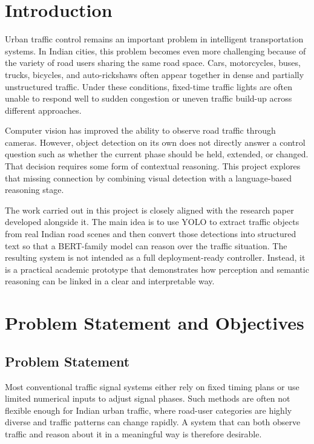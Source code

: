 \documentclass[12pt,a4paper]{report}
\begin{document}
\tableofcontents
\listoffigures
\listoftables

\clearpage
{}

\chapter{Introduction}
Urban traffic control remains an important problem in intelligent transportation systems. In Indian cities, this problem becomes even more challenging because of the variety of road users sharing the same road space. Cars, motorcycles, buses, trucks, bicycles, and auto-rickshaws often appear together in dense and partially unstructured traffic. Under these conditions, fixed-time traffic lights are often unable to respond well to sudden congestion or uneven traffic build-up across different approaches.

Computer vision has improved the ability to observe road traffic through cameras. However, object detection on its own does not directly answer a control question such as whether the current phase should be held, extended, or changed. That decision requires some form of contextual reasoning. This project explores that missing connection by combining visual detection with a language-based reasoning stage.

The work carried out in this project is closely aligned with the research paper developed alongside it. The main idea is to use YOLO to extract traffic objects from real Indian road scenes and then convert those detections into structured text so that a BERT-family model can reason over the traffic situation. The resulting system is not intended as a full deployment-ready controller. Instead, it is a practical academic prototype that demonstrates how perception and semantic reasoning can be linked in a clear and interpretable way.

\chapter{Problem Statement and Objectives}
\section*{Problem Statement}
Most conventional traffic signal systems either rely on fixed timing plans or use limited numerical inputs to adjust signal phases. Such methods are often not flexible enough for Indian urban traffic, where road-user categories are highly diverse and traffic patterns can change rapidly. A system that can both observe traffic and reason about it in a meaningful way is therefore desirable.
\end{document}
